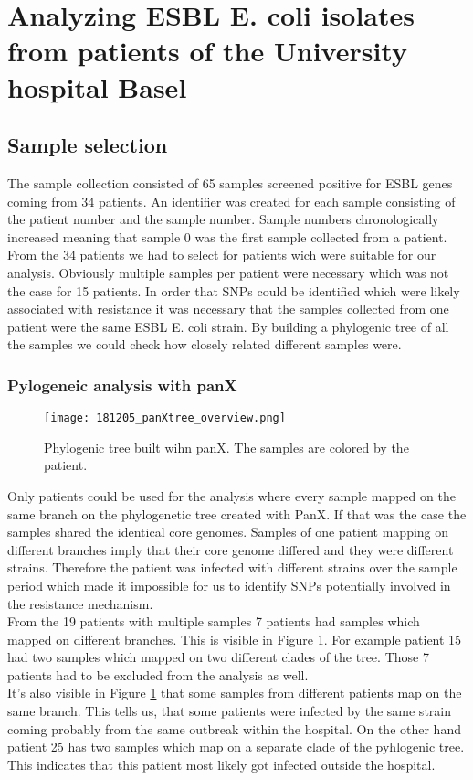 \section{Analyzing ESBL E. coli isolates from patients
of the University hospital Basel}
\subsection{Sample selection}
The sample collection consisted of 65 samples screened positive for ESBL genes coming from 34 patients. An identifier was created for each sample consisting of the patient number and the sample number. Sample numbers chronologically increased meaning that sample 0 was the first sample collected from a patient. From the 34 patients we had to select for patients wich were suitable for our analysis. Obviously multiple samples per patient were necessary which was not the case for 15 patients. In order that SNPs could be identified which were likely associated with resistance it was necessary that the samples collected from one patient were the same ESBL E. coli strain. By building a phylogenic tree of all the samples we could check how closely related different samples were.  

\subsubsection{Pylogeneic analysis with panX}
\begin{figure}
	\texttt{[image: 181205\_panXtree\_overview.png]}
	\caption{Phylogenic tree built wihn panX. The samples are colored by the patient.}
	\label{figure:panX}
\end{figure}
Only patients could be used for the analysis where every sample mapped on the same branch on the phylogenetic tree created with PanX. If that was the case the samples shared the identical core genomes. 
Samples of one patient mapping on different branches imply that their core genome differed and they were different strains. Therefore the patient was infected with different strains over the sample period which made it impossible for us to identify SNPs potentially involved in the resistance mechanism. \\
From the 19 patients with multiple samples 7 patients had samples which mapped on different branches. This is visible in Figure \ref{figure:panX}. For example patient 15 had two samples which mapped on two different clades of the tree.
Those 7 patients had to be excluded from the analysis as well. \\
It's also visible in Figure \ref{figure:panX} that some samples from different patients map on the same branch. This tells us, that some patients were infected by the same strain coming probably from the same outbreak within the hospital. On the other hand patient 25 has two samples which map on a separate clade of the pyhlogenic tree. This indicates that this patient most likely got infected outside the hospital.  


